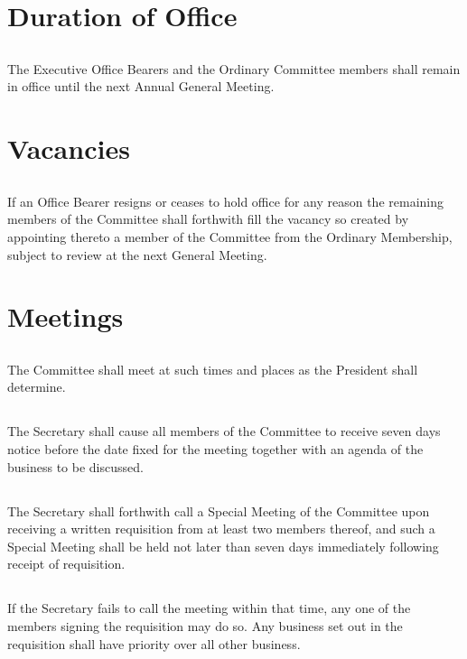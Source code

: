 \documentclass[10.5pt]{article}
\begin{document}
\section{Duration of Office}
\subsection{} The Executive Office Bearers and the Ordinary Committee members shall remain in office until the next Annual General Meeting.
\newline


\section{Vacancies}
\subsection{} If an Office Bearer resigns or ceases to hold office for any reason the remaining members of the Committee shall forthwith fill the vacancy so created by appointing thereto a member of the Committee from the Ordinary Membership, subject to review at the next General Meeting.
\newline


\section{Meetings}
\subsection{} The Committee shall meet at such times and places as the President shall determine.
\subsection{} The Secretary shall cause all members of the Committee to receive seven days notice before
the date fixed for the meeting together with an agenda of the business to be discussed.
\subsection{} The Secretary shall forthwith call a Special Meeting of the Committee upon receiving a
written requisition from at least two members thereof, and such a Special Meeting shall be held not
later than seven days immediately following receipt of requisition.
\subsection{} If the Secretary fails to call the meeting within that time, any one of the members signing the requisition may do so. Any business set out in the requisition shall have priority over all other business.
\newline
\end{document}
